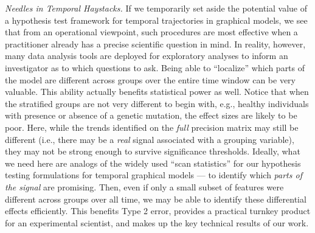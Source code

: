 {\em Needles in Temporal Haystacks.} If we temporarily set aside the potential value of a hypothesis test framework for temporal 
trajectories in graphical models, we see that
from an operational viewpoint, such procedures are most effective when a practitioner already has a precise scientific question in mind. In reality, however, 
many data analysis tools are deployed for exploratory analyses to inform an investigator as to which questions to ask. 
Being able to ``localize'' which parts of the model are different across groups over the entire time window can be very valuable. This ability actually 
benefits statistical power as well. Notice that when the stratified groups are not very different 
to begin with, e.g., healthy individuals with presence or absence of a genetic mutation, the
effect sizes are likely to be poor.
Here, while the trends identified on the {\em full} precision matrix may still be different (i.e., there may be a {\em real} signal 
associated with a grouping variable), 
they may not be strong enough to survive significance thresholds. Ideally, what we need here are analogs of the widely used ``scan statistics'' 
for our hypothesis testing formulations for temporal graphical models --- to identify which {\em parts of the signal} are promising. 
Then, even if only a small subset of 
features were different across groups over all time,
we may be able to identify these differential effects efficiently. This benefits Type 2 error, 
provides a practical turnkey product for an experimental scientist, and makes up the key technical results of our work.


